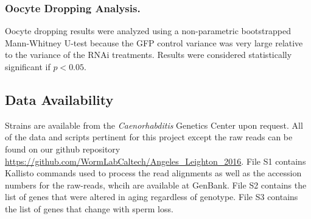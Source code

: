 \documentclass[9pt,twocolumn,twoside]{gsag3jnl}
\begin{document}
\subsubsection{Oocyte Dropping Analysis.}

Oocyte dropping results were analyzed using a non-parametric bootstrapped Mann-Whitney U-test because the GFP control variance was very large relative to the variance of the RNAi treatments. Results were considered statistically significant if $p<0.05$.


\subsection{Data Availability}
\label{sb:data_availability}
Strains are available from the \emph{Caenorhabditis} Genetics Center upon request. All of the data and scripts pertinent for this project except the raw reads can be found on our github repository \url{https://github.com/WormLabCaltech/Angeles_Leighton_2016}. File S1 contains Kallisto commands used to process the read alignments as well as the accession numbers for the raw-reads, whcih are available at GenBank. File S2 contains the list of genes that were altered in aging regardless of genotype. File S3 contains the list of genes that change with sperm loss.
\end{document}
